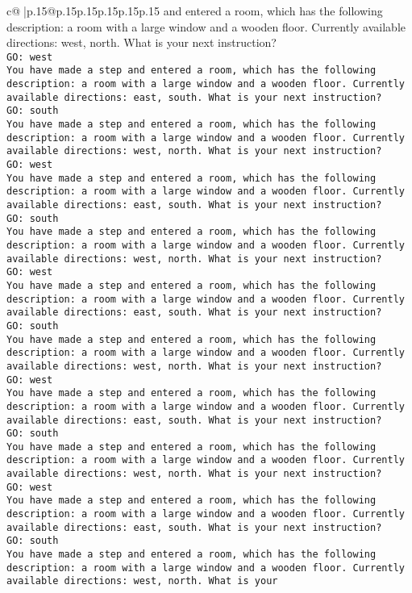 \documentclass{article}
\begin{document}
{\begin{supertabular}{c@{$\;$}|p{.15\linewidth}@{}p{.15\linewidth}p{.15\linewidth}p{.15\linewidth}p{.15\linewidth}p{.15\linewidth}}
{{{and entered a room, which has the following description: a room with a large window and a wooden floor. Currently available directions: west, north. What is your next instruction?\\ \tt GO: west\\ \tt You have made a step and entered a room, which has the following description: a room with a large window and a wooden floor. Currently available directions: east, south. What is your next instruction?\\ \tt GO: south\\ \tt You have made a step and entered a room, which has the following description: a room with a large window and a wooden floor. Currently available directions: west, north. What is your next instruction?\\ \tt GO: west\\ \tt You have made a step and entered a room, which has the following description: a room with a large window and a wooden floor. Currently available directions: east, south. What is your next instruction?\\ \tt GO: south\\ \tt You have made a step and entered a room, which has the following description: a room with a large window and a wooden floor. Currently available directions: west, north. What is your next instruction?\\ \tt GO: west\\ \tt You have made a step and entered a room, which has the following description: a room with a large window and a wooden floor. Currently available directions: east, south. What is your next instruction?\\ \tt GO: south\\ \tt You have made a step and entered a room, which has the following description: a room with a large window and a wooden floor. Currently available directions: west, north. What is your next instruction?\\ \tt GO: west\\ \tt You have made a step and entered a room, which has the following description: a room with a large window and a wooden floor. Currently available directions: east, south. What is your next instruction?\\ \tt GO: south\\ \tt You have made a step and entered a room, which has the following description: a room with a large window and a wooden floor. Currently available directions: west, north. What is your next instruction?\\ \tt GO: west\\ \tt You have made a step and entered a room, which has the following description: a room with a large window and a wooden floor. Currently available directions: east, south. What is your next instruction?\\ \tt GO: south\\ \tt You have made a step and entered a room, which has the following description: a room with a large window and a wooden floor. Currently available directions: west, north. What is your }}}
\end{supertabular}}
\end{document}
